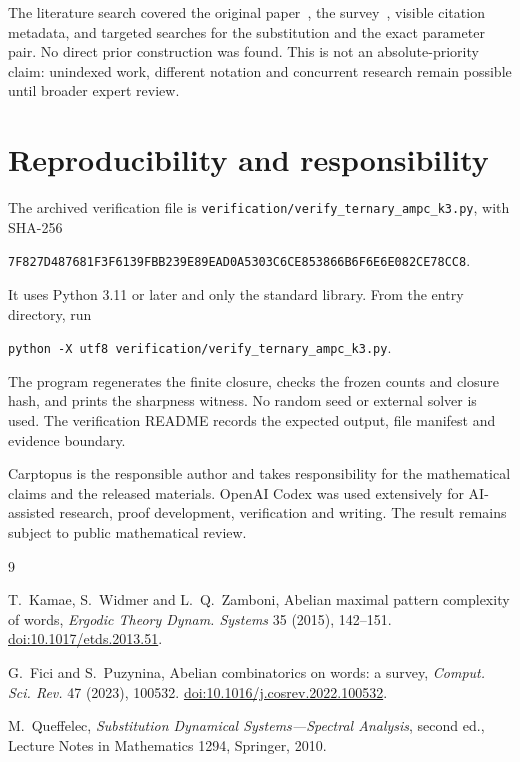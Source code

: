 \documentclass[11pt]{article}
\begin{document}
The literature search covered the original paper~\cite{KWZ}, the
survey~\cite{FP}, visible citation metadata, and targeted searches for the
substitution and the exact parameter pair. No direct prior construction was
found. This is not an absolute-priority claim: unindexed work, different
notation and concurrent research remain possible until broader expert review.

\section{Reproducibility and responsibility}

The archived verification file is
\texttt{verification/verify\_ternary\_ampc\_k3.py}, with SHA-256
\begin{center}
\small\texttt{7F827D487681F3F6139FBB239E89EAD0A5303C6CE853866B6F6E6E082CE78CC8}.
\end{center}
It uses Python 3.11 or later and only the standard library. From the entry
directory, run
\begin{center}
\texttt{python -X utf8 verification/verify\_ternary\_ampc\_k3.py}.
\end{center}
The program regenerates the finite closure, checks the frozen counts and
closure hash, and prints the sharpness witness. No random seed or external
solver is used. The verification README records the expected output, file
manifest and evidence boundary.

Carptopus is the responsible author and takes responsibility for the
mathematical claims and the released materials. OpenAI Codex was used
extensively for AI-assisted research, proof development, verification and
writing. The result remains subject to public mathematical review.

\begin{thebibliography}{9}

T.~Kamae, S.~Widmer and L.~Q.~Zamboni,
\newblock Abelian maximal pattern complexity of words,
\newblock \emph{Ergodic Theory Dynam. Systems} 35 (2015), 142--151.
\newblock \href{https://doi.org/10.1017/etds.2013.51}{doi:10.1017/etds.2013.51}.

G.~Fici and S.~Puzynina,
\newblock Abelian combinatorics on words: a survey,
\newblock \emph{Comput. Sci. Rev.} 47 (2023), 100532.
\newblock \href{https://doi.org/10.1016/j.cosrev.2022.100532}{doi:10.1016/j.cosrev.2022.100532}.

M.~Queffelec,
\newblock \emph{Substitution Dynamical Systems---Spectral Analysis},
\newblock second ed., Lecture Notes in Mathematics 1294, Springer, 2010.

\end{thebibliography}
\end{document}
